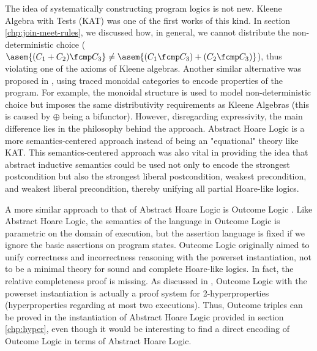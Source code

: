 The idea of systematically constructing program logics is not new. Kleene
Algebra with Tests (KAT) \cite{Kozen97} was one of the first works of this
kind. In section \ref{chp:join-meet-rules}, we discussed how, in general, we
cannot distribute the non-deterministic choice ($\asem{(C_1 + C_2) \fcmp C_3} \neq
\asem{(C_1 \fcmp C_3) + (C_2 \fcmp C_3)}$), thus violating one of the axioms of
Kleene algebras. Another similar alternative was proposed in \cite{Martin06},
using traced monoidal categories to encode properties of the program. For
example, the monoidal structure is used to model non-deterministic choice but
imposes the same distributivity requirements as Kleene Algebras (this is caused
by $\oplus$ being a bifunctor). However, disregarding expressivity, the main
difference lies in the philosophy behind the approach. Abstract Hoare Logic is
a more semantics-centered approach instead of being an "equational" theory like
KAT. This semantics-centered approach was also vital in providing the idea that
abstract inductive semantics could be used not only to encode the strongest
postcondition but also the strongest liberal postcondition, weakest
precondition, and weakest liberal precondition, thereby unifying all partial
Hoare-like logics.

A more similar approach to that of Abstract Hoare Logic is Outcome Logic
\cite{Zilberstein23}. Like Abstract Hoare Logic, the semantics of the language
in Outcome Logic is parametric on the domain of execution, but the assertion
language is fixed if we ignore the basic assertions on program states. Outcome
Logic originally aimed to unify correctness and incorrectness reasoning with
the powerset instantiation, not to be a minimal theory for sound and complete
Hoare-like logics. In fact, the relative completeness proof is missing. As
discussed in \cite{Darnier2023}, Outcome Logic with the powerset instantiation
is actually a proof system for 2-hyperproperties (hyperproperties regarding at
most two executions). Thus, Outcome triples can be proved in the instantiation
of Abstract Hoare Logic provided in section \ref{chp:hyper}, even though it
would be interesting to find a direct encoding of Outcome Logic in terms of
Abstract Hoare Logic.
